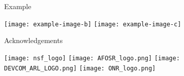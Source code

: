 \documentclass[final]{beamer}
\newlength{\sepwid}
\newlength{\onecolwid}
\begin{document}
\begin{frame}[t]
\begin{columns}[t]
\begin{column}{\onecolwid}
\end{column} %
\hspace{\sepwid}
\begin{column}{\onecolwid} %
    
    \begin{block}{Example}
        \lipsum[3][1-2]
        \begin{center}
            \texttt{[image: example-image-b]}
            \texttt{[image: example-image-c]}
            \vfill
        \end{center}
    \end{block}

    \begin{block}{Acknowledgements}
        \begin{center}
            \begin{minipage}{0.9\linewidth}
                \texttt{[image: nsf\_logo]}\hfill
                \texttt{[image: AFOSR\_logo.png]}\hfill
                \texttt{[image: DEVCOM\_ARL\_LOGO.png]}\hfill 
                \texttt{[image: ONR\_logo.png]} 
            \end{minipage}
        \end{center}
    \end{block}
\end{column}
\end{columns} %

\end{frame} %
\end{document}
